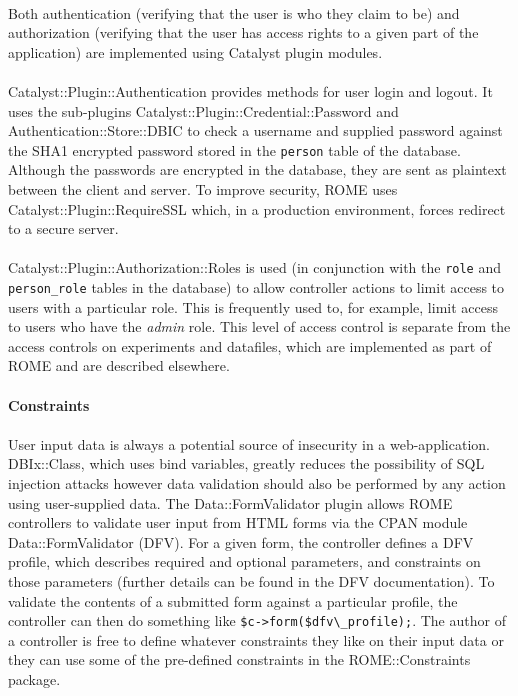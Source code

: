 \paragraph{}
Both authentication (verifying that the user is who they claim to be) and authorization (verifying that the user has access rights to a given part of the application) are implemented using Catalyst plugin modules. 

\paragraph{}
Catalyst::Plugin::Authentication provides methods for user login and logout. It uses the sub-plugins Catalyst::Plugin::Credential::Password and Authentication::Store::DBIC to check a username and supplied password against the SHA1 encrypted password stored in the \texttt{person} table of the database. Although the passwords are encrypted in the database, they are sent as plaintext between the client and server. To improve security, ROME uses Catalyst::Plugin::RequireSSL which, in a production environment, forces redirect to a secure server.

\paragraph{}
Catalyst::Plugin::Authorization::Roles is used (in conjunction with the \texttt{role} and \texttt{person\_role} tables in the database) to allow controller actions to limit access to users with a particular role. This is frequently used to, for example, limit access to users who have the \textit{admin} role. This level of access control is separate from the access controls on experiments and datafiles, which are implemented as part of ROME and are described elsewhere.


\paragraph{Constraints}

\paragraph{}
User input data is always a potential source of insecurity in a web-application. DBIx::Class, which uses bind variables, greatly reduces the possibility of SQL injection attacks however data validation should also be performed by any action using user-supplied data. The Data::FormValidator plugin allows ROME controllers to validate user input from HTML forms via the CPAN module Data::FormValidator (DFV). For a given form, the controller defines a DFV profile, which describes required and optional parameters, and constraints on those parameters (further details can be found in the DFV documentation). To validate the contents of a submitted form against a particular profile, the controller can then do something like \verb|$c->form($dfv\_profile);|. The author of a controller is free to define whatever constraints they like on their input data or they can use some of the pre-defined constraints in the ROME::Constraints package.

